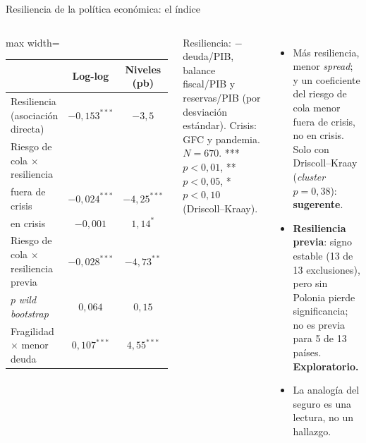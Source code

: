\documentclass[aspectratio=169]{beamer}
\begin{document}
\begin{frame}{Resiliencia de la política económica: el índice}
\begin{columns}[c]
\centering
\footnotesize
\begin{adjustbox}{max width=\textwidth}
\begin{tabular}{l cc}
\toprule
 & Log-log & Niveles (pb) \\
\midrule
Resiliencia (asociación directa) & $-0{,}153^{***}$ & $-3{,}5$ \\
Riesgo de cola $\times$ resiliencia & & \\
\quad fuera de crisis & $-0{,}024^{***}$ & $-4{,}25^{***}$ \\
\quad en crisis & $-0{,}001$ & $1{,}14^{*}$ \\
\addlinespace
Riesgo de cola $\times$ resiliencia previa & $-0{,}028^{***}$ & $-4{,}73^{**}$ \\
\quad $p$ \textit{wild bootstrap} & $0{,}064$ & $0{,}15$ \\
Fragilidad $\times$ menor deuda & $0{,}107^{***}$ & $4{,}55^{***}$ \\
\bottomrule
\end{tabular}
\end{adjustbox}

\vspace{3pt}
{\scriptsize\raggedright Resiliencia: $-$deuda/PIB, balance fiscal/PIB y reservas/PIB (por desviación estándar). Crisis: GFC y pandemia. $N=670$. *** $p<0{,}01$, ** $p<0{,}05$, * $p<0{,}10$ (Driscoll--Kraay).\par}
\footnotesize
\begin{itemize}\setlength\itemsep{2pt}
\item Más resiliencia, menor \textit{spread}; y un coeficiente del riesgo de cola menor fuera de crisis, no en crisis. Solo con Driscoll--Kraay (\textit{cluster} $p=0{,}38$): \textbf{sugerente}.
\item \textbf{Resiliencia previa}: signo estable (13 de 13 exclusiones), pero sin Polonia pierde significancia; no es previa para 5 de 13 países. \textbf{Exploratorio.}
\item La analogía del seguro es una lectura, no un hallazgo.
\end{itemize}
\end{columns}
\end{frame}
\end{document}
